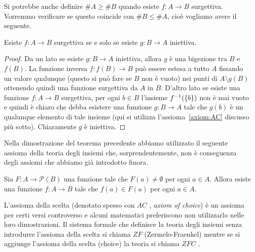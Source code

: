 Si potrebbe anche definire $\#A \ge \#B$ quando esiste $f\colon A \to B$
surgettiva. Vorremmo verificare se questo coincide con $\#B \le \#A$, 
cioè vogliamo avere il seguente.
%
\begin{theorem}\label{th:95444}
  Esiste $f\colon A\to B$ surgettiva 
  se e solo se esiste $g\colon B\to A$ iniettiva.
\end{theorem}
% 
\begin{proof}
Da un lato se esiste $g\colon B\to A$ iniettiva, allora $g$ è una bigezione 
tra $B$ e $f(B)$. La funzione inversa $f\colon f(B) \to B$ 
può essere estesa a tutto $A$ fissando un valore qualunque 
(questo si può fare se $B$ non è vuoto) nei punti di $A\setminus g(B)$
ottenendo quindi una funzione surgettiva da $A$ in $B$.
D'altro lato se esiste una funzione $f\colon A\to B$ surgettiva,
per ogni $b\in B$ l'insieme $f^{-1}({\left\{ b \right\}})$ non è mai 
vuoto e quindi è chiaro che debba esistere 
una funzione $g\colon B\to A$ tale che $g(b)$ è un qualunque elemento 
di tale insieme
(qui si utilizza l'assioma~\ref{axiom:AC} discusso più sotto). 
Chiaramente $g$ è iniettiva.
\end{proof}

Nella dimostrazione del teorema precedente abbiamo utilizzato il seguente assioma 
della teoria degli insiemi che, sorprendentemente, non è conseguenza degli assiomi 
che abbiamo già introdotto finora.

\begin{axiom}%
  \label{axiom:AC}%
  Sia $F\colon A \to \mathcal P(B)$
  una funzione tale che $F(a)\neq \emptyset$ 
  per ogni $a\in A$. Allora esiste una funzione
  $f\colon A \to B$ tale che $f(a)\in F(a)$
  per ogni $a\in A$.
\end{axiom}

L'assioma della scelta (denotato spesso con \emph{$AC$}%
%
, \emph{axiom of choice})
è un assioma per certi versi controverso
e alcuni matematici preferiscono non utilizzarlo nelle loro dimostrazioni.
Il sistema formale che definisce la teoria degli insiemi senza 
introdurre l'assioma della scelta 
si chiama \emph{$ZF$}%
%
 (Zermelo-Fraenkel) mentre 
se si aggiunge l'assioma della scelta (choice) la teoria si chiama 
\emph{$ZFC$}%
%
.

